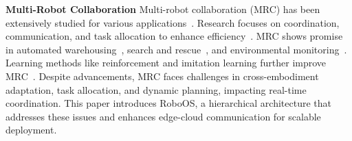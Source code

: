 \textbf{Multi-Robot Collaboration}  
Multi-robot collaboration (MRC) has been extensively studied for various applications~\cite{amazon_robotics_2025, mandi2024roco, an2023multi, liu2024coherent,HAO2025103018}. Research focuses on coordination, communication, and task allocation to enhance efficiency~\cite{rizk2019cooperative, fierro2018multi}. MRC shows promise in automated warehousing~\cite{agrawal2023rtaw}, search and rescue~\cite{guo2023cross}, and environmental monitoring~\cite{edwards2023collaborative}. Learning methods like reinforcement and imitation learning further improve MRC~\cite{patino2023learning, liu2023guide, pereida2018data}.
Despite advancements, MRC faces challenges in cross-embodiment adaptation, task allocation, and dynamic planning, impacting real-time coordination. This paper introduces RoboOS, a hierarchical architecture that addresses these issues and enhances edge-cloud communication for scalable deployment.


